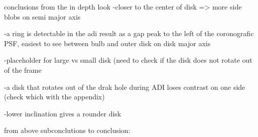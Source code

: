 conclusions from the in depth look
-closer to the center of disk => more side blobs on semi major axis

-a ring is detectable in the adi result as a gap peak to the left of the coronografic \ac{PSF}, easiest to see between bulb and outer disk on disk major axis

-placeholder for large vs small disk (need to check if the disk does not rotate out of the frame

-a disk that rotates out of the drak hole during \ac{ADI} loses contrast on one side (check which with the appendix)

-lower inclination gives a rounder disk

from above subconclutions to conclusion:



